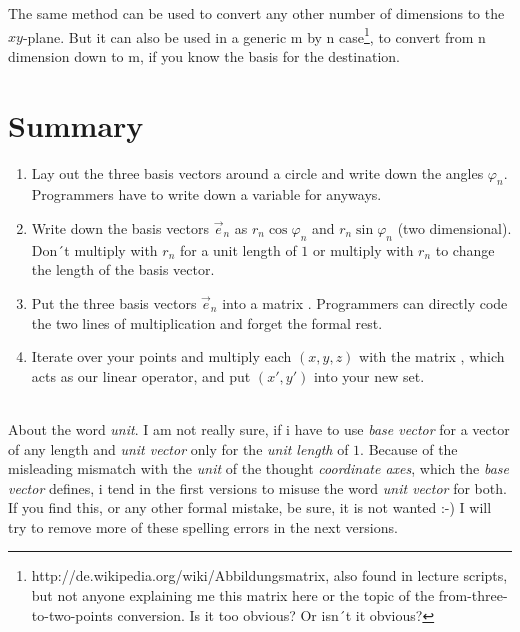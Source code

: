\documentclass{article}
\begin{document}
The same method can be used to convert any other number of dimensions to the $xy$-plane. But it can also be
used in a generic m by n case\footnote{http://de.wikipedia.org/wiki/Abbildungsmatrix, also found in lecture scripts, but not anyone explaining me this matrix here or the topic of the from-three-to-two-points conversion. Is it too obvious? Or isn´t it obvious?}, to convert from n dimension down to m, if you know the basis for the destination.

\section{Summary}

\begin{enumerate}
\item Lay out the three basis vectors around a circle and write down the angles $\varphi_n$. Programmers have to write down a variable for anyways.
\item Write down the basis vectors $\vec{e}_n$ as $r_n \cos \varphi_n$ and $r_n \sin \varphi_n$ (two dimensional). Don´t multiply with $r_n$ for a unit length of $1$ or multiply with $r_n$ to change the length of the basis vector.
\item Put the three basis vectors $\vec{e}_n$ into a matrix . Programmers can directly code the two lines of multiplication and forget the formal rest.
\item Iterate over your points and multiply each $(x,y,z)$ with the matrix , which acts as our linear operator, and put $(x',y')$ into your new set.
\end{enumerate}

\\
About the word \emph{unit}. I am not really sure, if i have to use \emph{base vector} for a vector of any length and \emph{unit vector} only for the \emph{unit length} of $1$. Because of the misleading mismatch with the \emph{unit} of the thought \emph{coordinate axes}, which the \emph{base vector} defines, i tend in the first versions to misuse the word \emph{unit vector} for both. If you find this, or any other formal mistake, be sure, it is not wanted :-) I will try to remove more of these spelling errors in the next versions.
\end{document}
